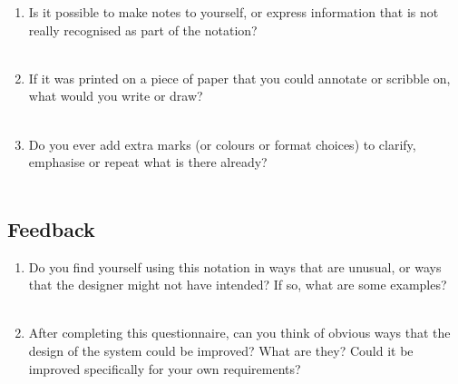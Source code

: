 \documentclass[14pt]{article}
\newcommand{\answerbox}{
\fbox{
\begin{minipage}{16cm}
\hfill\vspace{2cm}
\end{minipage}
}\\
}
\begin{document}
\begin{enumerate}
\item Is it possible to make notes to yourself, or express information that is not really recognised as part of the notation?\\
\answerbox
\item If it was printed on a piece of paper that you could annotate or scribble on, what would you write or draw?\\
\answerbox
\item Do you ever add extra marks (or colours or format choices) to clarify, emphasise or repeat what is there already?\\ %
\answerbox
\end{enumerate}

%

\subsection{Feedback}

\begin{enumerate}
\item Do you find yourself using this notation in ways that are unusual, or ways that the designer might not have intended? If so, what are some examples?\\
\answerbox
\item After completing this questionnaire, can you think of obvious ways that the design of the system could be improved? What are they? Could it be improved specifically for your own requirements?\\
\answerbox
\end{enumerate}
\end{document}
